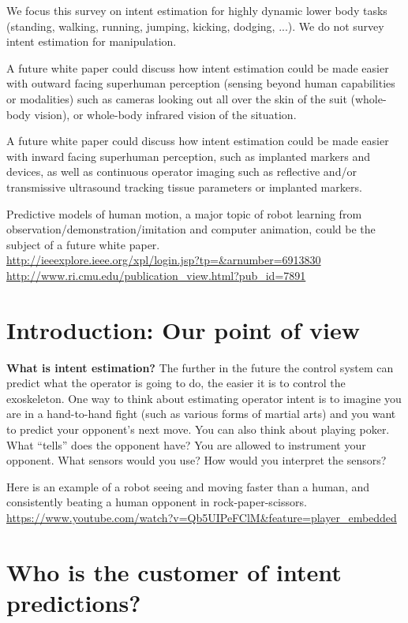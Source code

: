 \documentclass[letterpaper,12pt,fullpage]{article}
\begin{document}
We focus this survey on intent estimation for highly dynamic 
lower body tasks (standing, walking,
running, jumping, kicking, dodging, ...).
We do not survey intent estimation for manipulation. 

A future white paper could discuss how intent estimation could be 
made easier with outward facing
superhuman perception (sensing beyond human capabilities
or modalities) such as cameras looking out all over the skin
of the suit (whole-body vision), or whole-body 
infrared vision of the situation.

A future white paper could discuss how intent estimation could be 
made easier with inward facing superhuman perception,
such as implanted markers and devices, as well as continuous
operator imaging such as reflective and/or transmissive ultrasound
tracking tissue parameters or implanted markers.

Predictive models of human motion, a major topic of robot learning from\\
observation/demonstration/imitation and computer animation,
could be the subject of a future white
paper.\\
\url{http://ieeexplore.ieee.org/xpl/login.jsp?tp=&arnumber=6913830}\\
\url{http://www.ri.cmu.edu/publication_view.html?pub_id=7891}

\section{Introduction: Our point of view}

{\bf What is intent estimation?}
The further in the future the control system can predict what the operator
is going to do, the easier it is to control the exoskeleton. One way
to think about estimating operator intent is to imagine you are in
a hand-to-hand fight (such as various forms of martial arts)
and you want to predict your opponent's next move.
You can also think about playing poker. What ``tells'' does the opponent
have?
You are allowed to instrument your opponent. What sensors would you use?
How would you interpret the sensors?

Here is an example of a robot seeing and moving faster than a human, and
consistently beating a human opponent in rock-paper-scissors.\\
\url{https://www.youtube.com/watch?v=Qb5UIPeFClM&feature=player_embedded}

\section{Who is the customer of intent predictions?}
\end{document}
